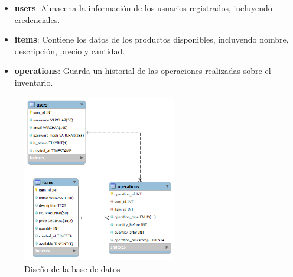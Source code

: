 \begin{itemize}
    \item \textbf{users}: Almacena la información de los usuarios registrados, incluyendo credenciales.
    \item \textbf{items}: Contiene los datos de los productos disponibles, incluyendo nombre, descripción, precio y cantidad.
    \item \textbf{operations}: Guarda un historial de las operaciones realizadas sobre el inventario.
\end{itemize}

\begin{figure}[H]
    \centering
    \includegraphics[width=0.6\textwidth]{diagrams/inventorydb}
    \caption{Diseño de la base de datos}
\end{figure}
